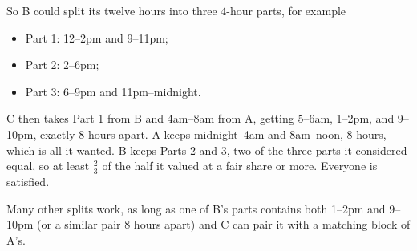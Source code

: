 \documentclass[12pt]{ximera}
\begin{document}
\begin{problem}
\begin{prompt}
\begin{feedback}
So B could split its twelve hours into three $4$-hour parts, for example
\begin{itemize}
\item Part 1: 12--2pm and 9--11pm;
\item Part 2: 2--6pm;
\item Part 3: 6--9pm and 11pm--midnight.
\end{itemize}
C then takes Part 1 from B and 4am--8am from A, getting 5--6am, 1--2pm, and 9--10pm,
exactly $8$ hours apart. A keeps midnight--4am and 8am--noon, $8$ hours, which is all it
wanted. B keeps Parts 2 and 3, two of the three parts it considered equal, so at least
$\frac23$ of the half it valued at a fair share or more. Everyone is satisfied.

Many other splits work, as long as one of B's parts contains both 1--2pm and 9--10pm (or
a similar pair $8$ hours apart) and C can pair it with a matching block of A's.
\end{feedback}
\end{prompt}
\end{problem}
\end{document}
